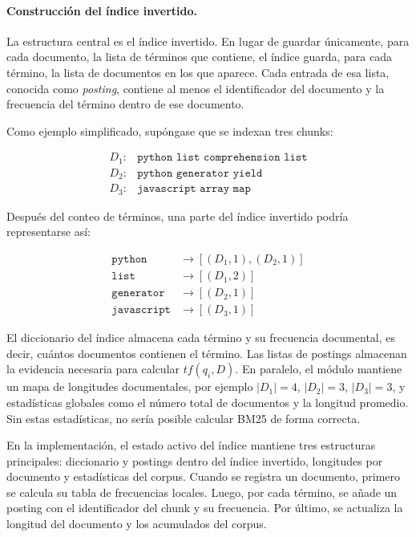 \documentclass[11pt]{article}
\begin{document}
\paragraph{Construcción del índice invertido.}
La estructura central es el índice invertido. En lugar de guardar únicamente, para cada documento,
la lista de términos que contiene, el índice guarda, para cada término, la lista de documentos en
los que aparece. Cada entrada de esa lista, conocida como \emph{posting}, contiene al menos el
identificador del documento y la frecuencia del término dentro de ese documento.

Como ejemplo simplificado, supóngase que se indexan tres chunks:

\[
\begin{array}{ll}
D_1: & \texttt{python list comprehension list} \\
D_2: & \texttt{python generator yield} \\
D_3: & \texttt{javascript array map}
\end{array}
\]

Después del conteo de términos, una parte del índice invertido podría representarse así:

\[
\begin{array}{ll}
\texttt{python} & \rightarrow [(D_1,1),(D_2,1)] \\
\texttt{list} & \rightarrow [(D_1,2)] \\
\texttt{generator} & \rightarrow [(D_2,1)] \\
\texttt{javascript} & \rightarrow [(D_3,1)]
\end{array}
\]

El diccionario del índice almacena cada término y su frecuencia documental, es decir, cuántos
documentos contienen el término. Las listas de postings almacenan la evidencia necesaria para
calcular \(tf(q_i,D)\). En paralelo, el módulo mantiene un mapa de longitudes documentales, por
ejemplo \(|D_1|=4\), \(|D_2|=3\), \(|D_3|=3\), y estadísticas globales como el número total de
documentos y la longitud promedio. Sin estas estadísticas, no sería posible calcular BM25 de
forma correcta.

En la implementación, el estado activo del índice mantiene tres estructuras principales:
diccionario y postings dentro del índice invertido, longitudes por documento y estadísticas del
corpus. Cuando se registra un documento, primero se calcula su tabla de frecuencias locales.
Luego, por cada término, se añade un posting con el identificador del chunk y su frecuencia. Por
último, se actualiza la longitud del documento y los acumulados del corpus.
\end{document}
